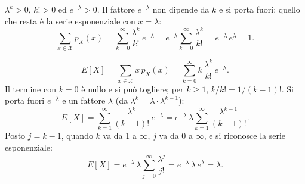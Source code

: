 
\begin{dimostrazione}
 $\lambda^k > 0$, $k! > 0$ ed $e^{-\lambda} > 0$.
 Il fattore $e^{-\lambda}$ non dipende da $k$ e si porta fuori; quello che resta è la serie
esponenziale con $x = \lambda$:
\[ \sum_{x \in \mathcal{X}} p_X(x) = \sum_{k=0}^{\infty} \frac{\lambda^k}{k!}\, e^{-\lambda}
   = e^{-\lambda} \sum_{k=0}^{\infty} \frac{\lambda^k}{k!} = e^{-\lambda}\, e^{\lambda} = 1 . \]
\end{dimostrazione}


\begin{dimostrazione}
\[ E[X] = \sum_{x \in \mathcal{X}} x\, p_X(x) = \sum_{k=0}^{\infty} k\, \frac{\lambda^k}{k!}\, e^{-\lambda} . \]
 Il termine con $k = 0$ è nullo e si può togliere; per $k \geq 1$,
$k/k! = 1/(k-1)!$. Si porta fuori $e^{-\lambda}$ e un fattore $\lambda$ (da $\lambda^k = \lambda \cdot
\lambda^{k-1}$):
\[ E[X] = \sum_{k=1}^{\infty} \frac{\lambda^k}{(k-1)!}\, e^{-\lambda} = e^{-\lambda}\, \lambda \sum_{k=1}^{\infty}
   \frac{\lambda^{k-1}}{(k-1)!} . \]
 Posto $j = k - 1$, quando $k$ va da 1 a $\infty$, $j$ va da 0 a $\infty$, e si riconosce la
serie esponenziale:
\[ E[X] = e^{-\lambda}\, \lambda \sum_{j=0}^{\infty} \frac{\lambda^j}{j!} = e^{-\lambda}\, \lambda\, e^{\lambda}
   = \lambda . \]
\end{dimostrazione}

